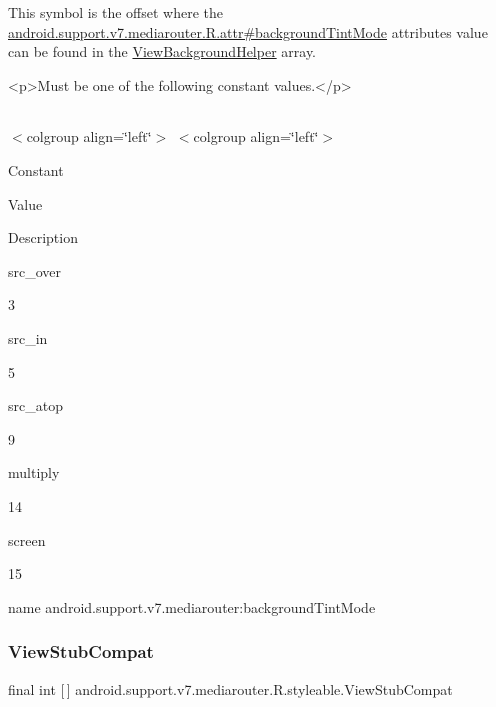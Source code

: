 This symbol is the offset where the \hyperlink{classandroid_1_1support_1_1v7_1_1mediarouter_1_1R_1_1attr_aefc80f6abace3364d34c2ae3f36b7b66}{android.\+support.\+v7.\+mediarouter.\+R.\+attr\#background\+Tint\+Mode} attribute\textquotesingle{}s value can be found in the \hyperlink{classandroid_1_1support_1_1v7_1_1mediarouter_1_1R_1_1styleable_a65c1a920f4419d63dca1770bf1dd35ca}{View\+Background\+Helper} array.

\begin{DoxyVerb}      <p>Must be one of the following constant values.</p>
\end{DoxyVerb}
 \tabulinesep=1mm
\begin{longtabu} spread 0pt [c]{*{0}{|X[-1]}|}
\hline
\end{longtabu}
$<$colgroup align=\char`\"{}left\char`\"{}$>$ $<$colgroup align=\char`\"{}left\char`\"{}$>$ 

Constant

Value

Description 

{\ttfamily src\+\_\+over}

3

{\ttfamily src\+\_\+in}

5

{\ttfamily src\+\_\+atop}

9

{\ttfamily multiply}

14

{\ttfamily screen}

15

name android.\+support.\+v7.\+mediarouter\+:background\+Tint\+Mode \mbox{\label{classandroid_1_1support_1_1v7_1_1mediarouter_1_1R_1_1styleable_a2fcde22ac0505d305fd8836a3252d763}} 
\subsubsection{\texorpdfstring{View\+Stub\+Compat}{ViewStubCompat}}
{\footnotesize\ttfamily final int \mbox{[}$\,$\mbox{]} android.\+support.\+v7.\+mediarouter.\+R.\+styleable.\+View\+Stub\+Compat\hspace{0.3cm}{\ttfamily [static]}}


